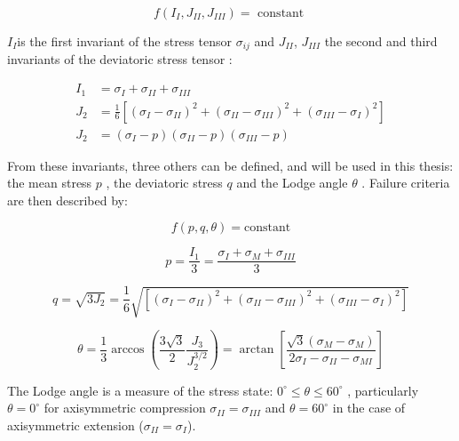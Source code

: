 \begin{equation}\label{eq2:fijjconst}
    f\left(I_{I}, J_{II}, J_{III} \right)=\text { constant }
\end{equation}

$I_{I}$is the first invariant of the stress tensor $\sigma_{ij}$ and $J_{II}$, $J_{III}$ the second and third invariants of the deviatoric stress tensor  : 

\begin{align}
   I_1 &= \sigma_{I} + \sigma_{II} + \sigma_{III} \\
   J_{2}&=\frac{1}{6}\left[\left(\sigma_{I}-\sigma_{I I}\right)^{2}+\left(\sigma_{I I}-\sigma_{I I I}\right)^{2}+\left(\sigma_{I I I}-\sigma_{I}\right)^{2}\right]\\
   J_{2}&=\left(\sigma_{I}-p\right)\left(\sigma_{I I}-p\right)\left(\sigma_{III}-p\right)
\end{align}

From these invariants, three others can be defined, and will be used in this thesis: the mean stress $p$ , the deviatoric stress $q$ and the Lodge angle $\theta$ . Failure criteria are then described by:

\begin{equation} \label{eq2:fpqtconst}
    f(p,q,\theta) = \text{constant}
\end{equation}

\begin{equation} \label{eq2:peq}
    p=\frac{I_{1}}{3}=\frac{\sigma_{I}+\sigma_{M}+\sigma_{III}}{3}
\end{equation}

\begin{equation}\label{eq2:qeq}
    q=\sqrt{3 J_{2}}=\frac{1}{6} \sqrt{\left[\left(\sigma_{I}-\sigma_{II}\right)^{2}+\left(\sigma_{II}-\sigma_{III}\right)^{2}+\left(\sigma_{III}-\sigma_{I}\right)^{2}\right]}
\end{equation}

\begin{equation}\label{eq2:theta}
    \theta=\frac{1}{3} \arccos \left(\frac{3 \sqrt{3}}{2} \frac{J_{3}}{J_{2}^{3 / 2}}\right)=\arctan \left[\frac{\sqrt{3}\left(\sigma_{M}-\sigma_{M}\right)}{2 \sigma_{I}-\sigma_{I I}-\sigma_{M I}}\right]
\end{equation}

The Lodge angle is a measure of the stress state: $0^{\circ} \leq \theta \leq 60^{\circ}$ , particularly $\theta = 0^{\circ}$  for axisymmetric compression $\sigma_{II} = \sigma_{III} $ and $\theta = 60^{\circ}$ in the case of axisymmetric extension ($\sigma_{II} = \sigma_{I} $). 

